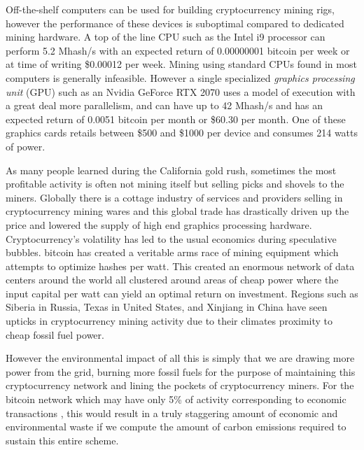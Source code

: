 
Off-the-shelf computers can be used for building cryptocurrency mining
rigs, however the performance of these devices is suboptimal compared to
dedicated mining hardware. A top of the line CPU such as the Intel i9
processor can perform 5.2 Mhash/s with an expected return of 0.00000001
bitcoin per week or at time of writing \$0.00012 per week. Mining using
standard CPUs found in most computers is generally infeasible. However a
single specialized \textit{graphics processing unit} (GPU) such as an Nvidia
GeForce RTX 2070 uses a model of execution with a great deal more
parallelism, and can have up to 42 Mhash/s and has an expected return of
0.0051 bitcoin per month or \$60.30 per month. One of these graphics
cards retails between \$500 and \$1000 per device and consumes 214 watts
of power.


As many people learned during the California gold rush, sometimes the most
profitable activity is often not mining itself but selling picks and shovels to
the miners. Globally there is a cottage industry of services and providers
selling in cryptocurrency mining wares and this global trade has drastically
driven up the price and lowered the supply of high end graphics processing
hardware. Cryptocurrency's volatility has led to the usual economics during
speculative bubbles. bitcoin has created a veritable arms race of mining
equipment which attempts to optimize hashes per watt. This created an enormous
network of data centers around the world all clustered around areas of cheap
power where the input capital per watt can yield an optimal return on
investment.  Regions such as Siberia in Russia, Texas in United States, and
Xinjiang in China have seen upticks in cryptocurrency mining activity due to
their climates proximity to cheap fossil fuel power.


However the environmental impact of all this is simply that we are drawing more
power from the grid, burning more fossil fuels for the purpose of maintaining
this cryptocurrency network and lining the pockets of cryptocurrency miners. For
the bitcoin network which may have only 5\% of activity corresponding to
economic transactions \cite{vigna2019most} , this would result in a truly
staggering amount of economic and environmental waste if we compute the amount
of carbon emissions required to sustain this entire scheme.

